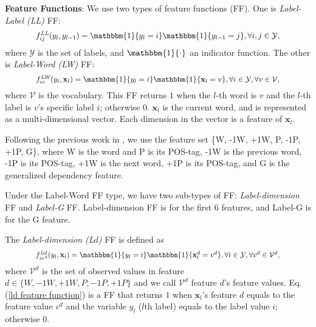 \documentclass[11pt,a4paper]{article}
\theoremstyle{definition}
\begin{document}
\noindent
{\bf Feature Functions}: We use two types of feature functions (FF). 
One is \emph{Label-Label (LL)} FF:
    \begin{equation}
    \label{ll feature function}
    \resizebox{0.85\hsize}{!}{
        $f_{ij}^{\textit{LL}}(y_l,y_{l-1})=\mathbbm{1}\{y_l=i\}\mathbbm{1}\{y_{l-1}=j\} ,\forall i,j \in \mathcal{Y},$
    }
    \end{equation}
where $\mathcal{Y}$ is the set of labels, and $\mathbbm{1}\{\cdot\} $ an indicator function.
The other is \emph{Label-Word (LW)} FF:
    \begin{equation}
    \label{lw feature function}
    \resizebox{0.85\hsize}{!}{
        $f_{iv}^{\textit{LW}}(y_l,\mathbf{x}_l) = \mathbbm{1}\{y_l=i\}\mathbbm{1}\{\mathbf{x}_l=v\} ,\forall i \in \mathcal{Y}, 
        \forall v \in \mathcal{V},$
    }
    \end{equation}
where $\mathcal{V}$ is the vocabulary. This FF returns $1$ when the $l$-th word is $v$ and the $l$-th label is $v$'s specific label $i$; otherwise $0$. $\mathbf{x}_l$ is the current word, and is represented as a multi-dimensional vector. Each dimension in the vector is a feature of $\mathbf{x}_l$.  

Following the previous work in \cite{Jakob2010}, 
we use the feature set \{W, -1W, +1W, P, -1P, +1P, G\}, where W is the word and P is its POS-tag, -1W is the previous word, -1P is its POS-tag, +1W is the next word, +1P is its POS-tag, and G is the generalized dependency feature. 

Under the Label-Word FF type, we have two sub-types of FF: {\em Label-dimension} FF and {\em Label-G} FF. Label-dimension FF is for the first 6 features, and Label-G is for the G feature. 

The \emph{Label-dimension (L$d$)} FF is defined as
\begin{equation}
\label{ld feature function}
\resizebox{0.85\hsize}{!}{
    $f_{iv^d}^{\textit{L}d}(y_l,\mathbf{x}_l) = \mathbbm{1}\{y_l=i\}\mathbbm{1}\{\mathbf{x}_l^d=v^d\}, \forall i \in \mathcal{Y}, 
    \forall v^d \in \mathcal{V}^d ,$
}
\end{equation}
where $\mathcal{V}^d$ is the set of observed values in feature $d \in \{W, -1W, +1W, P, -1P, +1P\}$ and we call $\mathcal{V}^d$ feature $d$'s feature values. Eq. (\ref{ld feature function}) is a FF that returns $1$ when $\mathbf{x}_l$'s feature $d$ equals to the feature value $v^d$ and the variable $y_l$ ($l$th label) equals to the label value $i$; otherwise 0.
\end{document}

